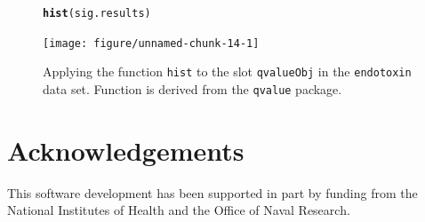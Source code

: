 \documentclass{article}\usepackage[]{graphicx}\usepackage[]{color}
\makeatletter
\newcommand{\hlstd}[1]{\textcolor[rgb]{0.345,0.345,0.345}{#1}}%
\newcommand{\hlkwd}[1]{\textcolor[rgb]{0.737,0.353,0.396}{\textbf{#1}}}%
\newenvironment{kframe}{%
 \def\at@end@of@kframe{}%
 \ifinner\ifhmode%
  \def\at@end@of@kframe{\end{minipage}}%
  \begin{minipage}{\columnwidth}%
 \fi\fi%
 \def\FrameCommand##1{\hskip\@totalleftmargin \hskip-\fboxsep
 \colorbox{shadecolor}{##1}\hskip-\fboxsep
     \hskip-\linewidth \hskip-\@totalleftmargin \hskip\columnwidth}%
 \MakeFramed {\advance\hsize-\width
   \@totalleftmargin\z@ \linewidth\hsize
   \@setminipage}}%
 {\par\unskip\endMakeFramed%
 \at@end@of@kframe}
\newenvironment{knitrout}{}{} %
\makeatother
\begin{document}
\begin{figure}[!htbp]
 \centering
\begin{knitrout}
\color{fgcolor}\begin{kframe}
\begin{alltt}
\hlkwd{hist}\hlstd{(sig.results)}
\end{alltt}
\end{kframe}

{\centering \texttt{[image: figure/unnamed-chunk-14-1]} 

}



\end{knitrout}
\caption{Applying the function {\tt hist} to the slot {\tt qvalueObj} in the {\tt endotoxin} data set. Function is derived from the {\tt qvalue} package.}
\label{fig:eqvalHist}
\end{figure}

\section*{Acknowledgements}
This software development has been supported in part by funding from the National Institutes of Health and the Office of Naval Research.


 
\end{document}

